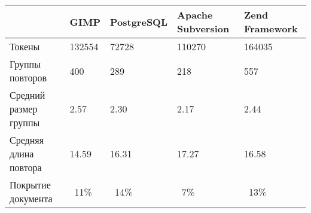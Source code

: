 \begin{minipage}{0.8\textwidth}
\begin{adjustbox}{center}
\begin{tabular}{|l||m{}|m{}|m{}|m{}|}
	\hline
	& GIMP & PostgreSQL & Apache Subversion & Zend Framework \\
	\hline
	\hline
	Токены & 132554 & 72728 & 110270 & 164035 \\
	\hline
	Группы повторов & 400 & 289 & 218  & 557 \\
	\hline
	Средний размер группы & 2.57 & 2.30 & 2.17 & 2.44 \\
	\hline
	Средняя длина повтора & 14.59 & 16.31 & 17.27 & 16.58 \\
	\hline
	Покрытие документа & ~11\% & ~14\% & ~7\% & ~13\% \\
	\hline
	
\end{tabular}
\end{adjustbox}
\end{minipage}